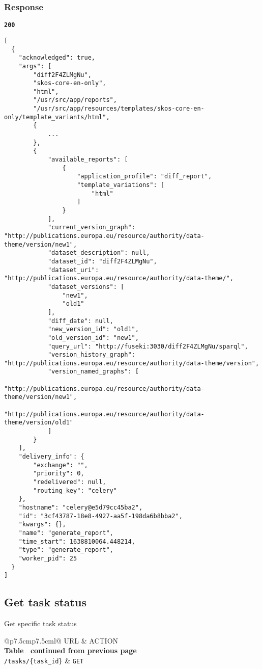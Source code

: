 \subsubsection{Response}
\textbf{\texttt{200}}
\begin{lstlisting}
[
  {
    "acknowledged": true,
    "args": [
        "diff2F4ZLMgNu",
        "skos-core-en-only",
        "html",
        "/usr/src/app/reports",
        "/usr/src/app/resources/templates/skos-core-en-only/template_variants/html",
        {
            ...
        },
        {
            "available_reports": [
                {
                    "application_profile": "diff_report",
                    "template_variations": [
                        "html"
                    ]
                }
            ],
            "current_version_graph": "http://publications.europa.eu/resource/authority/data-theme/version/new1",
            "dataset_description": null,
            "dataset_id": "diff2F4ZLMgNu",
            "dataset_uri": "http://publications.europa.eu/resource/authority/data-theme/",
            "dataset_versions": [
                "new1",
                "old1"
            ],
            "diff_date": null,
            "new_version_id": "old1",
            "old_version_id": "new1",
            "query_url": "http://fuseki:3030/diff2F4ZLMgNu/sparql",
            "version_history_graph": "http://publications.europa.eu/resource/authority/data-theme/version",
            "version_named_graphs": [
                "http://publications.europa.eu/resource/authority/data-theme/version/new1",
                "http://publications.europa.eu/resource/authority/data-theme/version/old1"
            ]
        }
    ],
    "delivery_info": {
        "exchange": "",
        "priority": 0,
        "redelivered": null,
        "routing_key": "celery"
    },
    "hostname": "celery@e5d79cc45ba2",
    "id": "3cf43787-18e8-4927-aa5f-198da6b8bba2",
    "kwargs": {},
    "name": "generate_report",
    "time_start": 1638810064.448214,
    "type": "generate_report",
    "worker_pid": 25
  }
]
\end{lstlisting}

\subsection{Get task status}
Get specific task status

\begin{longtable}[c]{@{}p{7.5cm}p{7.5cm}l@{}}
  \toprule
  URL                          & ACTION                       \\* \midrule
  \endfirsthead
  \multicolumn{3}{c}%
  {{\bfseries Table \thetable\ continued from previous page}} \\
  \endhead
  \bottomrule
  \endfoot
  \endlastfoot
  \texttt{/tasks/\{task\_id\}} & \texttt{GET}                 \\* \bottomrule
  \label{tab:rdf-differ-get-task}                             \\
\end{longtable}

